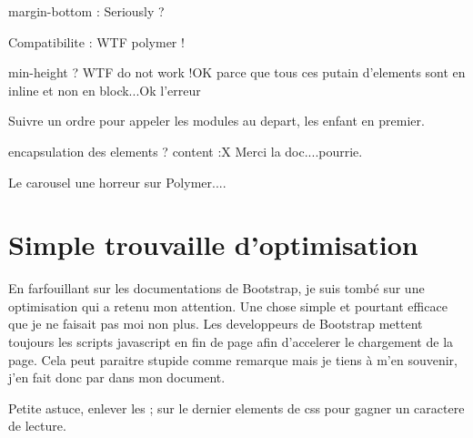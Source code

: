 \documentclass{article}
\begin{document}
margin-bottom : Seriously ?

Compatibilite : WTF polymer !

min-height ? WTF do not work !OK parce que tous ces putain d'elements sont en inline et non en block...Ok l'erreur

Suivre un ordre pour appeler les modules au depart, les enfant en premier.

encapsulation des elements ? content :X Merci la doc....pourrie.

Le carousel une horreur sur Polymer....

\section{Simple trouvaille d'optimisation}
En farfouillant sur les documentations de Bootstrap, je suis tomb\'e sur une optimisation qui a retenu mon attention. Une chose simple et pourtant efficace que je ne faisait pas moi non plus. Les developpeurs de Bootstrap mettent toujours les scripts javascript en fin de page afin d'accelerer le chargement de la page. Cela peut paraitre stupide comme remarque mais je tiens \`a m'en souvenir, j'en fait donc par dans mon document.

Petite astuce, enlever les ; sur le dernier elements de css pour gagner un caractere de lecture.
\end{document}
